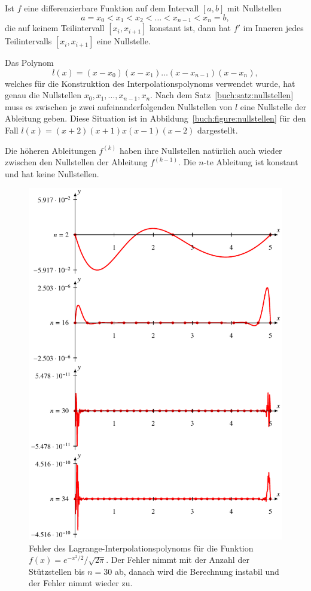 \begin{satz}
\label{buch:satz:nullstellen}
Ist $f$ eine differenzierbare Funktion auf dem Intervall $[a,b]$
mit Nullstellen 
\[
a=x_0 < x_1 < x_2 < \dots < x_{n-1} < x_n = b,
\]
die auf keinem Teilintervall $[x_i,x_{i+1}]$ konstant ist,
dann hat $f'$ im Inneren jedes Teilintervalls $[x_i, x_{i+1}]$
eine Nullstelle.
\end{satz}

Das Polynom 
\[
l(x) = (x-x_0)(x-x_1)\dots (x-x_{n-1})(x-x_n),
\]
welches für die Konstruktion des Interpolationspolynoms verwendet
wurde, hat genau die Nullstellen $x_0,x_1,\dots,x_{n-1},x_n$.
Nach dem Satz~\ref{buch:satz:nullstellen} muss es zwischen je
zwei aufeinanderfolgenden Nullstellen von $l$ eine Nullstelle der
Ableitung geben. 
Diese Situation ist in Abbildung~\ref{buch:figure:nullstellen}
für den Fall $l(x)=(x+2)(x+1)x(x-1)(x-2)$ dargestellt.

Die höheren Ableitungen $f^{(k)}$ haben ihre Nullstellen
natürlich auch wieder zwischen den Nullstellen der Ableitung $f^{(k-1)}$.
Die $n$-te Ableitung ist konstant und hat keine Nullstellen.

\begin{figure}
\centering
\includegraphics{chapters/30-interpolation/figures/norm.pdf}
\caption{Fehler des Lagrange-Interpolationspolynoms für die Funktion
$f(x)=e^{-x^2/2}/\sqrt{2\pi}$.
Der Fehler nimmt mit der Anzahl der Stützstellen bis $n=30$ ab, danach
wird die Berechnung instabil und der Fehler nimmt wieder zu.
\label{buch:figure:lagrangefehler}}
\end{figure}

